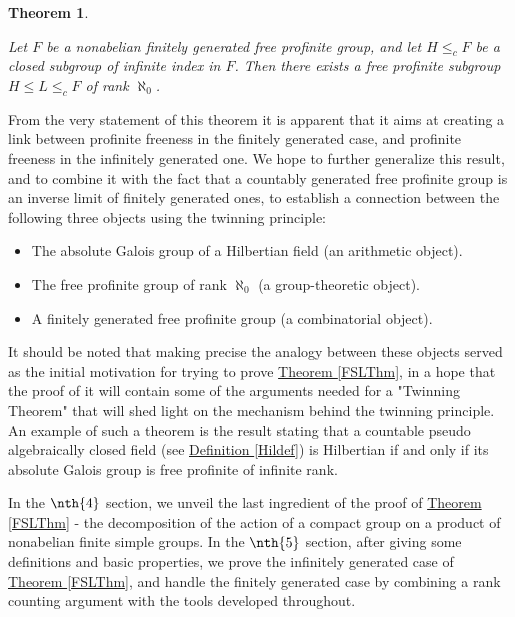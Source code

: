 \documentclass[12pt,a4paper]{article}
\newtheorem{theorem}{Theorem}[section]
\newcommand{\thmref}[1]{\hyperref[#1]{Theorem \ref*{#1}}}
\newcommand{\defref}[1]{\hyperref[#1]{Definition \ref*{#1}}}
\begin{document}
\begin{theorem} \label{FreeInterSubThm}

Let $F$ be a nonabelian finitely generated free profinite group, and let $H \leq_c F$ be a closed subgroup of infinite index in $F$. Then there exists a free profinite subgroup \mbox{$H \leq L \leq_c F$} of rank $\aleph_0$.

\end{theorem}

From the very statement of this theorem it is apparent that it aims at creating a link between profinite freeness in the finitely generated case, and profinite freeness in the infinitely generated one. We hope to further generalize this result, and to combine it with the fact that a countably generated free profinite group is an inverse limit of finitely generated ones, to establish a connection between the following three objects using the twinning principle: 

\begin{itemize}

\item The absolute Galois group of a Hilbertian field (an arithmetic object).

\item The free profinite group of rank $\aleph_0$ (a group-theoretic object).

\item A finitely generated free profinite group (a combinatorial object). 

\end{itemize}

It should be noted that making precise the analogy between these objects served as the initial motivation for trying to prove \thmref{FSLThm}, in a hope that the proof of it will contain some of the arguments needed for a "Twinning Theorem" that will shed light on the mechanism behind the twinning principle. An example of such a theorem is the result stating that a countable pseudo algebraically closed field (see \defref{Hildef}) is Hilbertian if and only if its absolute Galois group is free profinite of infinite rank.

In the $\nth{4}$ section, we unveil the last ingredient of the proof of \thmref{FSLThm} - the decomposition of the action of a compact group on a product of nonabelian finite simple groups. In the $\nth{5}$ section, after giving some definitions and basic properties, we prove the infinitely generated case of \thmref{FSLThm}, and handle the finitely generated case by combining a rank counting argument with the tools developed throughout.
\end{document}
